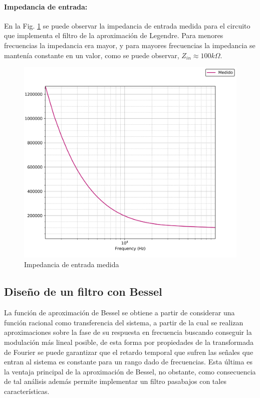 \paragraph{Impedancia de entrada:} En la Fig. \ref{fig:legendre_impedancia_entrada} se puede observar la impedancia de entrada medida para el circuito que implementa
el filtro de la aproximaci\'on de Legendre. Para menores frecuencias la impedancia era mayor, y para mayores frecuencias la impedancia se manten\'ia constante en un valor,
como se puede observar, $Z_{in} \approx 100k\Omega$.

\begin{figure}[H]
	\centering
	\includegraphics[scale=0.7]{../EJ1/Recursos/legendre_impedancia_entrada.png}
	\caption{Impedancia de entrada medida}
	\label{fig:legendre_impedancia_entrada}
\end{figure}

\subsection{Dise\~no de un filtro con Bessel}
La funci\'on de aproximaci\'on de Bessel se obtiene a partir de considerar una funci\'on racional como transferencia del sistema, a partir de la cual se realizan aproximaciones sobre la fase de su respuesta en frecuencia
buscando conseguir la modulaci\'on m\'as lineal posible, de esta forma por propiedades de la transformada de Fourier se puede garantizar que el retardo temporal que sufren las se\~nales que entran al sistema es constante
para un rango dado de frecuencias. Esta \'ultima es la ventaja principal de la aproximaci\'on de Bessel, no obstante, como consecuencia de tal an\'alisis adem\'as permite implementar un filtro pasabajos con tales caracter\'isticas.

